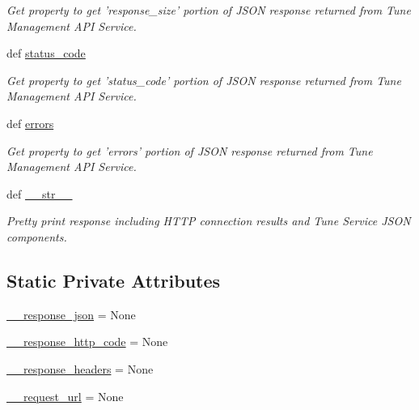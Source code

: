 \begin{DoxyCompactItemize}
\begin{DoxyCompactList}\small\item\em Get property to get 'response\-\_\-size' portion of J\-S\-O\-N response returned from Tune Management A\-P\-I Service. \end{DoxyCompactList}\item 
def \hyperlink{classtune_1_1management_1_1service_1_1response_1_1Response_a10a95432a282af7407bddd9344d730f6}{status\-\_\-code}
\begin{DoxyCompactList}\small\item\em Get property to get 'status\-\_\-code' portion of J\-S\-O\-N response returned from Tune Management A\-P\-I Service. \end{DoxyCompactList}\item 
def \hyperlink{classtune_1_1management_1_1service_1_1response_1_1Response_a93e5e055921312176f698952a93d3313}{errors}
\begin{DoxyCompactList}\small\item\em Get property to get 'errors' portion of J\-S\-O\-N response returned from Tune Management A\-P\-I Service. \end{DoxyCompactList}\item 
def \hyperlink{classtune_1_1management_1_1service_1_1response_1_1Response_a9ecb3db9eb6591a7d23d3ab7ec547b99}{\-\_\-\-\_\-str\-\_\-\-\_\-}
\begin{DoxyCompactList}\small\item\em Pretty print response including H\-T\-T\-P connection results and Tune Service J\-S\-O\-N components. \end{DoxyCompactList}\end{DoxyCompactItemize}
\subsection*{Static Private Attributes}
\begin{DoxyCompactItemize}
\item 
\hyperlink{classtune_1_1management_1_1service_1_1response_1_1Response_a7204647871c6fae73990626219ba1edf}{\-\_\-\-\_\-response\-\_\-json} = None
\item 
\hyperlink{classtune_1_1management_1_1service_1_1response_1_1Response_a92924ef057f2e75f8238f3761e418fca}{\-\_\-\-\_\-response\-\_\-http\-\_\-code} = None
\item 
\hyperlink{classtune_1_1management_1_1service_1_1response_1_1Response_a04c01c415d84f9ab4a13d73339c68d30}{\-\_\-\-\_\-response\-\_\-headers} = None
\item 
\hyperlink{classtune_1_1management_1_1service_1_1response_1_1Response_acbdfb2cb79419de467e392991dbd1c78}{\-\_\-\-\_\-request\-\_\-url} = None
\end{DoxyCompactItemize}


